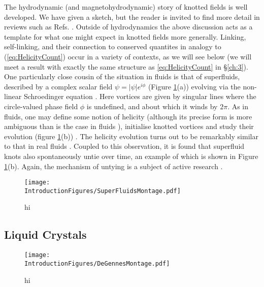 The hydrodynamic (and magnetohydrodynamic) story of knotted fields is well developed. We have given a sketch, but the reader is invited to find more detail in reviews such as Refs. \cite{Moffat, Irvine}. Outside of hydrodynamics the above discussion acts as a template for what one might expect in knotted fields more generally. Linking, self-linking, and their connection to conserved quantites in analogy to (\ref{eq:HelicityCount}) occur in a variety of contexts, as we will see below (we will meet a result with exactly the same structure as \ref{eq:HelicityCount} in \S \ref{ch:3}). One particularly close cousin of the situation in fluids is that of superfluids, described by a complex scalar field $\psi = |\psi| e^{i \phi}$ (Figure \ref{fig:SuperFluidMontage}(a)) evolving via the non-linear Schroedinger equation \cite{}. Here vortices are given by singular lines where the circle-valued phase field $\phi$ is undefined, and about which it winds by $2\pi$. As in fluids, one may define some notion of helicity (although its precise form is more ambiguous than is the case in fluids \cite{Salman}), initialise knotted vortices and study their evolution (figure \ref{fig:SuperFluidMontage}(b)) \cite{Scheeler}. The helicity evolution turns out to be remarkably similar to that in real fluids \cite{Scheeler}. Coupled to this observation, it is found that superfluid knots also spontaneously untie over time, an example of which is shown in Figure \ref{fig:SuperFluidMontage}(b). Again, the mechanism of untying is a subject of active research \cite{Scheeler}.
\begin{figure}[htbp]
\centering
\texttt{[image: \\IntroductionFigures/SuperFluidsMontage.pdf]}
\caption{hi }
\label{fig:SuperFluidMontage}
\end{figure}

\subsection{Liquid Crystals}

\begin{figure}[htbp]
\centering
\texttt{[image: \\IntroductionFigures/DeGennesMontage.pdf]}
\caption{hi }
\label{fig:DeGennesMontage}
\end{figure}

